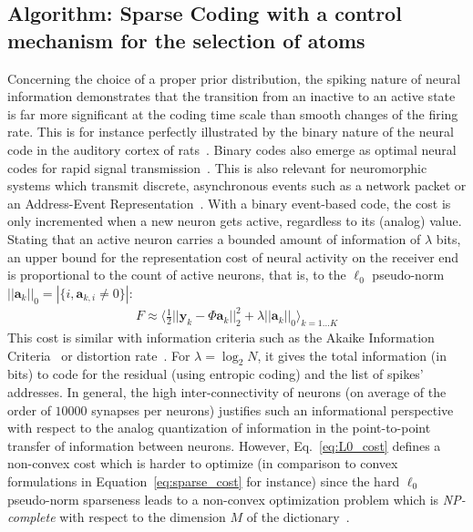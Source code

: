 \documentclass[vision,article,submit,oneauthor,pdftex]{Definitions/mdpi}
\newcommand{\coef}{\mathbf{a}} %
\newcommand{\image}{\mathbf{y}} %
\newcommand{\dico}{\Phi} %
\newcommand{\enscond}[2]{\lbrace #1, #2 \rbrace}
\newcommand{\norm}[1]{|\!| #1 |\!|}
\newcommand{\abs}[1]{\left|#1\right|}
\newcommand{\seeEq}[1]{Eq.~\ref{eq:#1}}%
\begin{document}
\subsection{Algorithm: Sparse Coding with a control mechanism for the selection of atoms}
Concerning the choice of a proper prior distribution, the spiking nature of neural information demonstrates that the transition from an inactive to an active state is far more significant at the coding time scale than smooth changes of the firing rate. This is for instance perfectly illustrated by the binary nature of the neural code in the auditory cortex of rats~\citep{DeWeese03}. Binary codes also emerge as optimal neural codes for rapid signal transmission~\citep{Bethge03}. This is also relevant for neuromorphic systems which transmit discrete, asynchronous events such as a network packet or an Address-Event Representation~\citep{Khoei19}. With a binary event-based code, the cost is only incremented when a new neuron gets active, regardless to its (analog) value. Stating that an active neuron carries a bounded amount of information of $\lambda$ bits, an upper bound for the representation cost of neural activity on the receiver end is proportional to the count of active neurons, that is, to the $\ell_0$ pseudo-norm $\norm{\coef_{k}}_0 = \abs{\enscond{i}{\coef_{k, i} \neq 0}}$:%
\begin{align}%
F \approx   \langle \frac{1}{2} \norm{\image_k - \dico \coef_{k}}_2^2 + \lambda\norm{\coef_{k}}_0 \rangle_{k = 1 \ldots K}%
\label{eq:L0_cost}%
\end{align}%
This cost is similar with information criteria such as the Akaike Information Criteria~\citep{Akaike74} or distortion rate~\cite[p.~571]{Mallat98}. For $\lambda=\log_2 N$, it gives the total information (in bits) to code for the residual (using entropic coding) and the list of spikes' addresses. In general, the high inter-connectivity of neurons (on average of the order of $10000$ synapses per neurons) justifies such an informational perspective with respect to the analog quantization of information in the point-to-point transfer of information between neurons.
However, \seeEq{L0_cost} defines a non-convex cost which is harder to optimize (in comparison to convex formulations in Equation~\ref{eq:sparse_cost} for instance) since the hard $\ell_0$ pseudo-norm sparseness leads to a non-convex optimization problem which is \emph{NP-complete} with respect to the dimension $M$ of the dictionary~\cite[p.~418]{Mallat98}.
\end{document}
